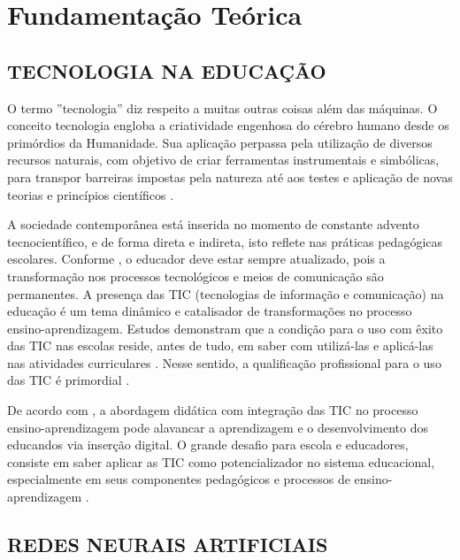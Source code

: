 
\chapter{\textbf{Fundamentação Teórica}} %
\sloppy %

\section{TECNOLOGIA NA EDUCAÇÃO}

O termo ''tecnologia'' diz respeito a muitas outras coisas além das máquinas. O conceito tecnologia engloba a criatividade engenhosa do cérebro humano desde os primórdios da Humanidade. Sua aplicação perpassa pela utilização de diversos recursos naturais, com objetivo de criar ferramentas instrumentais e simbólicas, para transpor barreiras impostas pela natureza até aos testes e aplicação de novas teorias e princípios científicos \cite{kenski2007educaccao}.

A sociedade contemporânea está inserida no momento de constante advento tecnocientífico, e de forma direta e indireta, isto reflete nas práticas pedagógicas escolares. Conforme , o educador deve estar sempre atualizado, pois a transformação nos processos tecnológicos e meios de comunicação são permanentes. A presença das TIC (tecnologias de informação e comunicação) na educação é um tema dinâmico e catalisador de transformações no processo ensino-aprendizagem. Estudos demonstram que a condição para o uso com êxito das TIC nas escolas reside, antes de tudo, em saber com utilizá-las e aplicá-las nas atividades curriculares \cite{noeth2004evaluating}. Nesse sentido, a qualificação profissional para o uso das TIC é primordial \cite{david2008padroes}.

De acordo com , a abordagem didática com integração das TIC no processo ensino-aprendizagem pode alavancar a aprendizagem e o desenvolvimento dos educandos via inserção digital. O grande desafio para escola e educadores, consiste em saber aplicar as TIC como potencializador no sistema educacional, especialmente em seus componentes pedagógicos e processos de ensino-aprendizagem \cite{libaneoorganizacao}.

\section{REDES NEURAIS ARTIFICIAIS}

